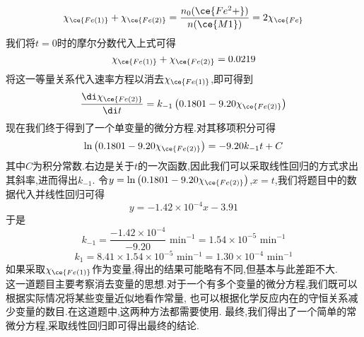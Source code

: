 \documentclass{ctexart}
\begin{document}
\begin{solution}
\begin{enumerate}[label=\tbf{\arabic{Pcounter}-\arabic*},topsep=0pt,parsep=0pt,itemsep=0pt,partopsep=0pt]
            \[\chi_{\ce{Fe(1)}}+\chi_{\ce{Fe(2)}}=\dfrac{n_0(\ce{Fe^2+})}{n(\ce{{M1}})}=2\chi_{\ce{Fe}}\]
            我们将$t=0$时的摩尔分数代入上式可得
            \[\chi_{\ce{Fe(1)}}+\chi_{\ce{Fe(2)}}=0.0219\]
            将这一等量关系代入速率方程以消去$\chi_{\ce{Fe(1)}}$,即可得到
            \[\dfrac{\di\chi_{\ce{Fe(2)}}}{\di t}=k_{-1}\left(0.1801-9.20\chi_{\ce{Fe(2)}}\right)\]
            现在我们终于得到了一个单变量的微分方程.对其移项积分可得
            \[\ln\left(0.1801-9.20\chi_{\ce{Fe(2)}}\right)=-9.20k_{-1}t+C\]
            其中$C$为积分常数.右边是关于$t$的一次函数,因此我们可以采取线性回归的方式求出其斜率,进而得出$k_{-1}$.%
            令$y=\ln\left(0.1801-9.20\chi_{\ce{Fe(2)}}\right)$,$x=t$,我们将题目中的数据代入并线性回归可得
            \[y=-1.42\times10^{-4}x-3.91\]
            于是
            \[k_{-1}=\dfrac{-1.42\times10^{-4}}{-9.20}\text{ min}^{-1}=1.54\times10^{-5}\text{ min}^{-1}\]
            \[k_1=8.41\times1.54\times10^{-5}\text{ min}^{-1}=1.30\times10^{-4}\text{ min}^{-1}\]
            如果采取$\chi_{\ce{Fe(1)}}$作为变量,得出的结果可能略有不同,但基本与此差距不大.\\
            这一道题目主要考察消去变量的思想.对于一个有多个变量的微分方程,我们既可以根据实际情况将某些变量近似地看作常量,%
            也可以根据化学反应内在的守恒关系减少变量的数目.在这道题中,这两种方法都需要使用.%
            最终,我们得出了一个简单的常微分方程,采取线性回归即可得出最终的结论.
    \end{enumerate}
\end{solution}
\end{document}
